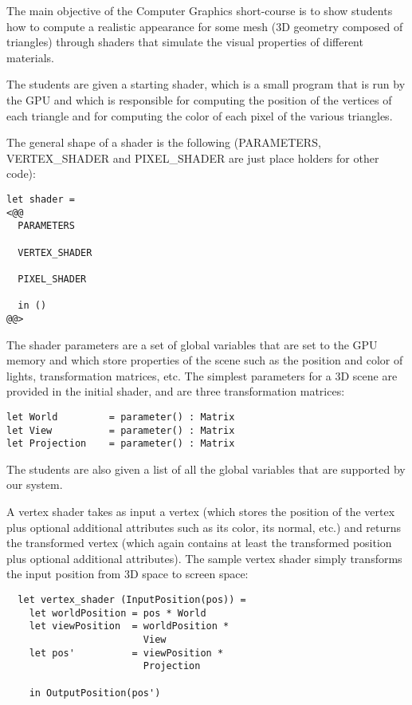 
The main objective of the Computer Graphics short-course is to show students how to compute a realistic appearance for some mesh (3D geometry composed of triangles) through shaders that simulate the visual properties of different materials.

The students are given a starting shader, which is a small program that is run by the GPU and which is responsible for computing the position of the vertices of each triangle and for computing the color of each pixel of the various triangles.

The general shape of a shader is the following (PARAMETERS, VERTEX\_SHADER and PIXEL\_SHADER are just place holders for other code):

\begin{lstlisting}
let shader = 
<@@
  PARAMETERS

  VERTEX_SHADER
  
  PIXEL_SHADER
  
  in ()
@@>
\end{lstlisting}

The shader parameters are a set of global variables that are set to the GPU memory and which store properties of the scene such as the position and color of lights, transformation matrices, etc. The simplest parameters for a 3D scene are provided in the initial shader, and are three transformation matrices: 

\begin{lstlisting}
let World         = parameter() : Matrix
let View          = parameter() : Matrix
let Projection    = parameter() : Matrix
\end{lstlisting}

The students are also given a list of all the global variables that are supported by our system.

A vertex shader takes as input a vertex (which stores the position of the vertex plus optional additional attributes such as its color, its normal, etc.) and returns the transformed vertex (which again contains at least the transformed position plus optional additional attributes). The sample vertex shader simply transforms the input position from 3D space to screen space:

\begin{lstlisting}
  let vertex_shader (InputPosition(pos)) =
    let worldPosition = pos * World
    let viewPosition  = worldPosition * 
                        View
    let pos'          = viewPosition * 
                        Projection

    in OutputPosition(pos')
\end{lstlisting}


